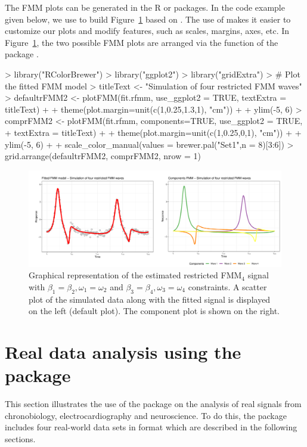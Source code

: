 The FMM plots can be generated in the R  or  packages. In the code example given below, we use  to build Figure~\ref{f:sim2} based on . The use of  makes it easier to customize our plots and modify features, such as scales, margins, axes, etc. 
In Figure~\ref{f:sim2}, the two possible FMM plots are arranged via the  function of the  package \citep{Auguie:2017}.
%
\begin{example}
> library("RColorBrewer")
> library("ggplot2")
> library("gridExtra")
> # Plot the fitted FMM model
> titleText <- "Simulation of four restricted FMM waves"
> defaultrFMM2 <- plotFMM(fit.rfmm, use_ggplot2 = TRUE, textExtra = titleText) +
+                 theme(plot.margin=unit(c(1,0.25,1.3,1), "cm")) +
+                 ylim(-5, 6)
> comprFMM2 <- plotFMM(fit.rfmm, components=TRUE, use_ggplot2 = TRUE, 
+                      textExtra = titleText) +
+              theme(plot.margin=unit(c(1,0.25,0,1), "cm")) +
+              ylim(-5, 6) +
+              scale_color_manual(values = brewer.pal("Set1",n = 8)[3:6])
> grid.arrange(defaultrFMM2, comprFMM2, nrow = 1)
\end{example}

\begin{figure}[!ht]
	\centering
	\includegraphics[width=1\textwidth]{Figure_Sim2.pdf}
	\caption{Graphical representation of the estimated restricted FMM$_4$ signal with $\beta_1 = \beta_2, \omega_1 = \omega_2$ and $\beta_3 = \beta_4, \omega_3 = \omega_4$ constraints. A scatter plot of the simulated data along with the fitted signal is displayed on the left (default plot). The component plot is shown on the right.}
	\label{f:sim2}
\end{figure}

\section{Real data analysis using the  package}\label{sec:realExamp}
This section illustrates the use of the  package on the analysis of real signals from chronobiology, electrocardiography and neuroscience. To do this, the package includes four real-world data sets in  format which are described in the following sections.


